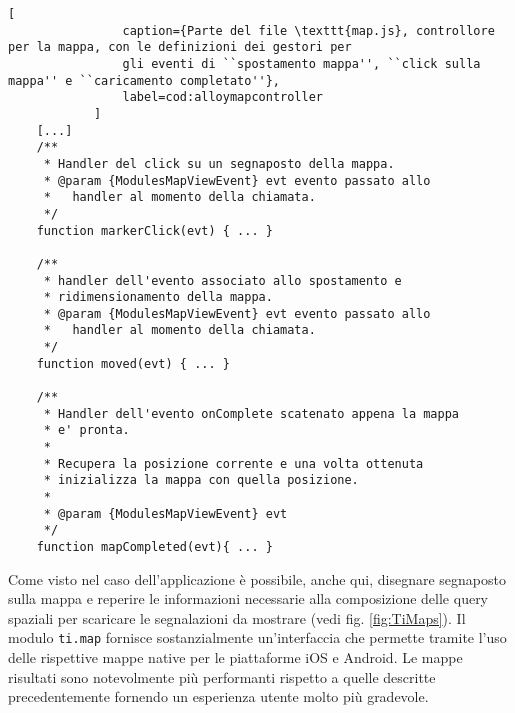             \begin{lstlisting}[
                caption={Parte del file \texttt{map.js}, controllore per la mappa, con le definizioni dei gestori per
                gli eventi di ``spostamento mappa'', ``click sulla mappa'' e ``caricamento completato''},
                label=cod:alloymapcontroller
            ]
    [...]
    /**
     * Handler del click su un segnaposto della mappa.
     * @param {ModulesMapViewEvent} evt evento passato allo
     *   handler al momento della chiamata.
     */
    function markerClick(evt) { ... }

    /**
     * handler dell'evento associato allo spostamento e
     * ridimensionamento della mappa.
     * @param {ModulesMapViewEvent} evt evento passato allo
     *   handler al momento della chiamata.
     */
    function moved(evt) { ... }

    /**
     * Handler dell'evento onComplete scatenato appena la mappa
     * e' pronta.
     *
     * Recupera la posizione corrente e una volta ottenuta
     * inizializza la mappa con quella posizione.
     *
     * @param {ModulesMapViewEvent} evt
     */
    function mapCompleted(evt){ ... }

            \end{lstlisting}
            Come visto nel caso dell'applicazione \pg{} è possibile, anche qui,
            disegnare segnaposto sulla mappa e reperire le informazioni
            necessarie alla composizione delle query spaziali per scaricare le
            segnalazioni da mostrare (vedi fig. \ref{fig:TiMaps}). Il modulo
            \texttt{ti.map} fornisce sostanzialmente un'interfaccia che permette
            tramite \js{} l'uso delle rispettive mappe native per le piattaforme
            iOS e Android. Le mappe risultati sono notevolmente più performanti
            rispetto a quelle descritte precedentemente fornendo un esperienza
            utente molto più gradevole.

